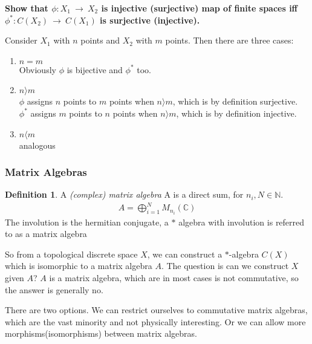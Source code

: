 \documentclass[a4paper]{article}
\newcounter{exercise}
\newenvironment{MyExercise}%
{\begin{mdframed}[style=exercisestyle]}{\end{mdframed}}
\theoremstyle{definition}
\newtheorem{definition}{Definition}
\theoremstyle{definition}
\theoremstyle{definition}
\theoremstyle{theorem}
\theoremstyle{theorem}
\begin{document}
\begin{MyExercise}
    \textbf{
    Show that $\phi :X_1\ \rightarrow \ X_2$ is injective (surjective) map of finite spaces iff
    $\phi ^* :C(X_2)\ \rightarrow \ C(X_1)$ is surjective (injective).
}\newline

    Consider $X_1$ with $n$ points and $X_2$ with $m$ points. Then there are three cases:
    \begin{enumerate}
        \item $n=m$ \\
            Obviously $\phi$ is bijective and $\phi ^*$ too.
        \item $n \rangle  m$ \\
            $\phi$ assigns $n$ points to $m$ points when $n \rangle  m$,
            which is by definition surjective. \\
            $\phi ^*$ assigns $m$ points to $n$ points when $n \rangle  m$,
            which is by definition injective. \\
        \item $n \langle  m $ \\
            analogous
    \end{enumerate}
\end{MyExercise}

\subsubsection{Matrix Algebras}
\begin{definition}
    A \textit{(complex) matrix algebra} A is a direct sum, for $n_i, N \in \mathbb{N}$.
    \begin{align*}
        A = \bigoplus _{i=1}^{N} M_{n_i}(\mathbb{C})
    \end{align*}
    The involution is the hermitian conjugate, a $*$ algebra with involution is referred to as
    a matrix algebra
\end{definition}

So from a topological discrete space $X$, we can construct a $*$-algebra $C(X)$ which is isomorphic
to a matrix algebra $A$. The question is can we construct $X$ given $A$? $A$ is a matrix algebra,
which are in most cases is not commutative, so the answer is generally no.

There are two options. We can restrict ourselves to commutative matrix algebras,
which are the vast minority and not physically interesting.
Or we can allow more morphisms(isomorphisms) between matrix algebras.
\end{document}
